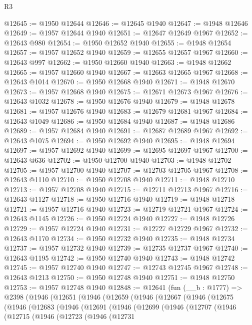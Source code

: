 \begin{lexlean}{R3}
\begin{coremodule}
@12645 := @1950 @12644
@12646 := @12645 @1940
@12647 := @1948 @12646
@12649 := @1957 @12644 @1940
@12651 := @12647 @12649 @1967
@12652 := @12643 @980
@12654 := @1950 @12652 @1940
@12655 := @1948 @12654
@12657 := @1957 @12652 @1940
@12659 := @12655 @12657 @1967
@12660 := @12643 @997
@12662 := @1950 @12660 @1940
@12663 := @1948 @12662
@12665 := @1957 @12660 @1940
@12667 := @12663 @12665 @1967
@12668 := @12643 @1014
@12670 := @1950 @12668 @1940
@12671 := @1948 @12670
@12673 := @1957 @12668 @1940
@12675 := @12671 @12673 @1967
@12676 := @12643 @1032
@12678 := @1950 @12676 @1940
@12679 := @1948 @12678
@12681 := @1957 @12676 @1940
@12683 := @12679 @12681 @1967
@12684 := @12643 @1049
@12686 := @1950 @12684 @1940
@12687 := @1948 @12686
@12689 := @1957 @12684 @1940
@12691 := @12687 @12689 @1967
@12692 := @12643 @1075
@12694 := @1950 @12692 @1940
@12695 := @1948 @12694
@12697 := @1957 @12692 @1940
@12699 := @12695 @12697 @1967
@12700 := @12643 @636
@12702 := @1950 @12700 @1940
@12703 := @1948 @12702
@12705 := @1957 @12700 @1940
@12707 := @12703 @12705 @1967
@12708 := @12643 @1110
@12710 := @1950 @12708 @1940
@12711 := @1948 @12710
@12713 := @1957 @12708 @1940
@12715 := @12711 @12713 @1967
@12716 := @12643 @1127
@12718 := @1950 @12716 @1940
@12719 := @1948 @12718
@12721 := @1957 @12716 @1940
@12723 := @12719 @12721 @1967
@12724 := @12643 @1145
@12726 := @1950 @12724 @1940
@12727 := @1948 @12726
@12729 := @1957 @12724 @1940
@12731 := @12727 @12729 @1967
@12732 := @12643 @1170
@12734 := @1950 @12732 @1940
@12735 := @1948 @12734
@12737 := @1957 @12732 @1940
@12739 := @12735 @12737 @1967
@12740 := @12643 @1195
@12742 := @1950 @12740 @1940
@12743 := @1948 @12742
@12745 := @1957 @12740 @1940
@12747 := @12743 @12745 @1967
@12748 := @12643 @1213
@12750 := @1950 @12748 @1940
@12751 := @1948 @12750
@12753 := @1957 @12748 @1940
@12848 := @12641
    (fun (__b : @1777) =>
    @2398
      (@1946
        (@12651
          (@1946
            (@12659
              (@1946
                (@12667
                  (@1946
                    (@12675
                      (@1946
                        (@12683
                          (@1946
                            (@12691
                              (@1946
                                (@12699
                                  (@1946
                                    (@12707
                                      (@1946
                                        (@12715
                                          (@1946
                                            (@12723
                                              (@1946
                                                (@12731

\end{coremodule}
\end{lexlean}
